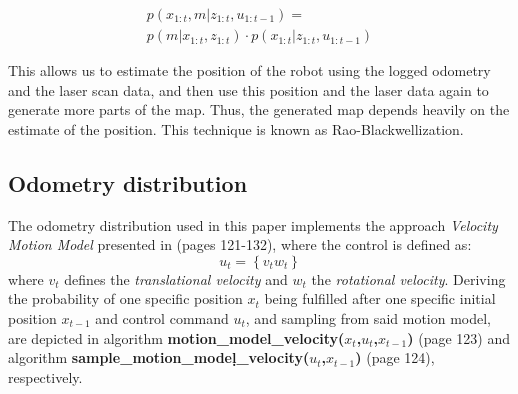 \documentclass[letterpaper]{article}
\begin{document}
\begin{multline}
p(x_{1:t},m|z_{1:t}, u_{1:t-1}) = \\ p(m|x_{1:t},z_{1:t}) \cdot p(x_{1:t}|z_{1:t}, u_{1:t-1})
\end{multline}

This allows us to estimate the position of the robot using the logged odometry and the laser scan data, and then use this position and the laser data again to generate more parts of the map. Thus, the generated map depends heavily on the estimate of the position. This technique is known as Rao-Blackwellization.

\subsection{Odometry distribution}
The odometry distribution used in this paper implements the approach  \textit{Velocity Motion Model} presented in \cite{ProbabilisticRobotics} (pages 121-132), where the control is defined as:
\begin{equation*}
u_t = \left\{ v_t w_t \right\}
\end{equation*}
where $v_t$ defines the \textit{translational velocity} and $w_t$ the \textit{rotational velocity}. Deriving the probability of one specific position $x_t$ being fulfilled after one specific initial position $x_{t-1}$ and control command $u_t$, and sampling from said motion model, are depicted in algorithm \textbf{motion\_model\_velocity($x_t$,$u_t$,$x_{t-1}$)} (page 123) and algorithm \textbf{sample\_motion\_model\d_velocity($u_t$,$x_{t-1}$)} (page 124), respectively.
\end{document}
